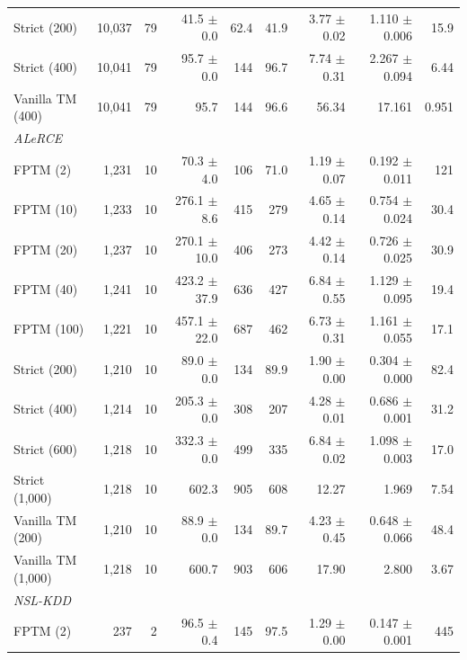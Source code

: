 \documentclass[preprint,review,12pt]{elsarticle}
\newcommand{\hyp}[1]{#1}   %
\begin{document}
\begin{table}
\begin{tabular}{lrrrrrrrr}
Strict (200) & 10,037 & 79 & 41.5 $\pm$ 0.0 & \hyp{62.4} & \hyp{41.9} & \hyp{3.77 $\pm$ 0.02} & \hyp{1.110 $\pm$ 0.006} & \hyp{15.9} \\
Strict (400) & 10,041 & 79 & 95.7 $\pm$ 0.0 & \hyp{144} & \hyp{96.7} & \hyp{7.74 $\pm$ 0.31} & \hyp{2.267 $\pm$ 0.094} & \hyp{6.44} \\
Vanilla TM (400) & 10,041 & 79 & 95.7 & \hyp{144} & \hyp{96.6} & \hyp{56.34} & \hyp{17.161} & \hyp{0.951} \\
\midrule
\multicolumn{9}{l}{\textit{ALeRCE}} \\
FPTM (2) & 1,231 & 10 & 70.3 $\pm$ 4.0 & \hyp{106} & \hyp{71.0} & \hyp{1.19 $\pm$ 0.07} & \hyp{0.192 $\pm$ 0.011} & \hyp{121} \\
FPTM (10) & 1,233 & 10 & 276.1 $\pm$ 8.6 & \hyp{415} & \hyp{279} & \hyp{4.65 $\pm$ 0.14} & \hyp{0.754 $\pm$ 0.024} & \hyp{30.4} \\
FPTM (20) & 1,237 & 10 & 270.1 $\pm$ 10.0 & \hyp{406} & \hyp{273} & \hyp{4.42 $\pm$ 0.14} & \hyp{0.726 $\pm$ 0.025} & \hyp{30.9} \\
FPTM (40) & 1,241 & 10 & 423.2 $\pm$ 37.9 & \hyp{636} & \hyp{427} & \hyp{6.84 $\pm$ 0.55} & \hyp{1.129 $\pm$ 0.095} & \hyp{19.4} \\
FPTM (100) & 1,221 & 10 & 457.1 $\pm$ 22.0 & \hyp{687} & \hyp{462} & \hyp{6.73 $\pm$ 0.31} & \hyp{1.161 $\pm$ 0.055} & \hyp{17.1} \\
Strict (200) & 1,210 & 10 & 89.0 $\pm$ 0.0 & \hyp{134} & \hyp{89.9} & \hyp{1.90 $\pm$ 0.00} & \hyp{0.304 $\pm$ 0.000} & \hyp{82.4} \\
Strict (400) & 1,214 & 10 & 205.3 $\pm$ 0.0 & \hyp{308} & \hyp{207} & \hyp{4.28 $\pm$ 0.01} & \hyp{0.686 $\pm$ 0.001} & \hyp{31.2} \\
Strict (600) & 1,218 & 10 & 332.3 $\pm$ 0.0 & \hyp{499} & \hyp{335} & \hyp{6.84 $\pm$ 0.02} & \hyp{1.098 $\pm$ 0.003} & \hyp{17.0} \\
Strict (1,000) & 1,218 & 10 & 602.3 & \hyp{905} & \hyp{608} & \hyp{12.27} & \hyp{1.969} & \hyp{7.54} \\
Vanilla TM (200) & 1,210 & 10 & 88.9 $\pm$ 0.0 & \hyp{134} & \hyp{89.7} & \hyp{4.23 $\pm$ 0.45} & \hyp{0.648 $\pm$ 0.066} & \hyp{48.4} \\
Vanilla TM (1,000) & 1,218 & 10 & 600.7 & \hyp{903} & \hyp{606} & \hyp{17.90} & \hyp{2.800} & \hyp{3.67} \\
\midrule
\multicolumn{9}{l}{\textit{NSL-KDD}} \\
FPTM (2) & 237 & 2 & 96.5 $\pm$ 0.4 & \hyp{145} & \hyp{97.5} & \hyp{1.29 $\pm$ 0.00} & \hyp{0.147 $\pm$ 0.001} & \hyp{445} \\

\end{tabular}
\end{table}
\end{document}
